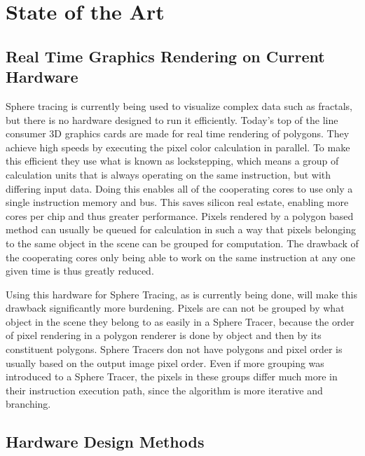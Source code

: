 \chapter{State of the Art}

\section{ Real Time Graphics Rendering on Current Hardware } 

Sphere tracing is currently being used to visualize complex data such as 
fractals, but there is no hardware designed to run it efficiently. Today's top 
of the line consumer 3D graphics cards are made for real time rendering of 
polygons. They achieve high speeds by executing the pixel color calculation in 
parallel. To make this efficient they use what is known as lockstepping, which 
means a group of calculation units that is always operating on the same 
instruction, but with differing input data. Doing this enables all of the 
cooperating cores to use only a single instruction memory and bus. This saves 
silicon real estate, enabling more cores per chip and thus greater performance. 
Pixels rendered by a polygon based method can usually be queued for calculation 
in such a way that pixels belonging to the same object in the scene can be 
grouped for computation. The drawback of the cooperating cores only being able 
to work on the same instruction at any one given time is thus greatly reduced.

Using this hardware for Sphere Tracing, as is currently being done, will make 
this drawback significantly more burdening. Pixels are can not be grouped by
what object in the scene they belong to as easily in a Sphere Tracer, because
the order of pixel rendering in a polygon renderer is done by object and then
by its constituent polygons. Sphere Tracers don not have polygons and pixel 
order is usually based on the output image pixel order. Even if more grouping 
was introduced to a Sphere Tracer, the pixels in these groups differ much more 
in their instruction execution path, since the algorithm is more iterative and 
branching.

\section{ Hardware Design Methods  } 

